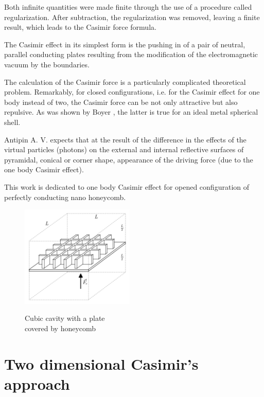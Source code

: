 \documentclass[11pt]{article}
\begin{document}
Both infinite quantities were made finite through the use of a procedure
called regularization. After subtraction, the regularization was
removed, leaving a finite result, which leads to the Casimir force
formula.

The Casimir effect in its simplest form is the pushing in of a pair of
neutral, parallel conducting plates resulting from the modification of
the electromagnetic vacuum by the boundaries.

The calculation of the Casimir force is a particularly complicated
theoretical problem. Remarkably, for closed configurations, i.e. for the
Casimir effect for one body instead of two, the Casimir force can be not
only attractive but also repulsive. As was shown by Boyer
\cite{Boyer1968}, the latter is true for an ideal metal spherical shell.

Antipin A. V. \cite{Antipin2012} expects that at the result of the
difference in the effects of the virtual particles (photons) on the
external and internal reflective surfaces of pyramidal, conical or
corner shape, appearance of the driving force (due to the one body
Casimir effect).

This work is dedicated to one body Casimir effect for opened
configuration of perfectly conducting nano honeycomb.

    \begin{figure}
\begin{center}
\includegraphics[width=0.48\textwidth]{honeycomb_box_L.png}
\caption{}{Cubic cavity with a plate \\ covered by honeycomb}
\end{center}
\label{fig:honeycomb_box_L}
\end{figure}

    \section{Two dimensional Casimir's
approach}\label{two-dimensional-casimirs-approach}
\end{document}
